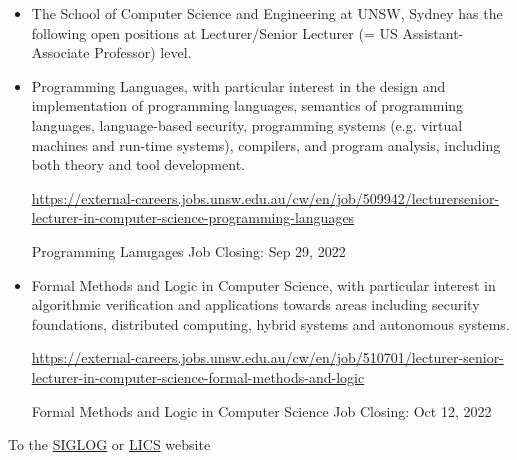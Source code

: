 \documentclass[prodmode,acmtecs]{acmsmall} %
\begin{document}
\begin{itemize}\item The School of Computer Science and Engineering at UNSW, Sydney has the following open positions at Lecturer/Senior Lecturer (= US Assistant-Associate Professor) level.  
 
\item  Programming Languages, with particular interest in the design and implementation of programming languages, semantics of programming languages, language-based security, programming systems (e.g. virtual machines and run-time systems), compilers, and program analysis, including both theory and tool development.  
 
  \href{https://external-careers.jobs.unsw.edu.au/cw/en/job/509942/lecturersenior-lecturer-in-computer-science-programming-languages}{https://external-careers.jobs.unsw.edu.au/cw/en/job/509942/lecturersenior-lecturer-in-computer-science-programming-languages} 
 
Programming Lanugages Job Closing: Sep 29, 2022 
 
\item  Formal Methods and Logic in Computer Science, with particular interest in algorithmic verification and applications towards areas including security foundations, distributed computing, hybrid systems and autonomous systems.  
 
  \href{https://external-careers.jobs.unsw.edu.au/cw/en/job/510701/lecturer-senior-lecturer-in-computer-science-formal-methods-and-logic}{https://external-careers.jobs.unsw.edu.au/cw/en/job/510701/lecturer-senior-lecturer-in-computer-science-formal-methods-and-logic}  
 
Formal Methods and Logic in Computer Science Job Closing: Oct 12, 2022 
 
\end{itemize}


To the \href{http://siglog.org/}{SIGLOG} or \href{https://lics.siglog.org}{LICS} website
\end{document}
